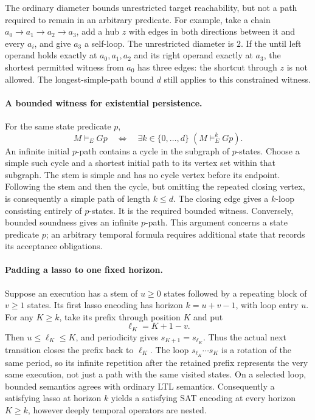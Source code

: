 The ordinary diameter bounds unrestricted target reachability,
but not a path required to remain in an arbitrary predicate.
For example, take a chain \(a_0\to a_1\to a_2\to a_3\),
add a hub \(z\) with edges in both directions between it
and every \(a_i\), and give \(a_3\) a self-loop. The
unrestricted diameter is \(2\). If the until left operand
holds exactly at \(a_0,a_1,a_2\) and its right operand
exactly at \(a_3\), the shortest permitted witness from
\(a_0\) has three edges: the shortcut through \(z\) is
not allowed. The longest-simple-path bound \(d\) still
applies to this constrained witness.

\paragraph{A bounded witness for existential persistence.}
For the same state predicate \(p\),
\[
 M\models_E Gp
 \quad\Longleftrightarrow\quad
 \exists k\in\{0,\ldots,d\}\;(M\models_E^k Gp).
\]
An infinite initial \(p\)-path contains a cycle in the subgraph of
\(p\)-states. Choose a simple such cycle and a shortest initial path to
its vertex set within that subgraph. The stem is simple and has no cycle
vertex before its endpoint. Following the stem and then the cycle, but
omitting the repeated closing vertex, is consequently a simple path of
length \(k\leq d\). The closing edge gives a \(k\)-loop consisting entirely
of \(p\)-states. It is the required bounded witness. Conversely, bounded
soundness gives an infinite \(p\)-path. This argument concerns a state
predicate \(p\); an arbitrary temporal formula requires additional state
that records its acceptance obligations.

\paragraph{Padding a lasso to one fixed horizon.}
Suppose an execution has a stem of \(u\geq0\) states followed by
a repeating block of \(v\geq1\) states. Its first lasso encoding
has horizon \(k=u+v-1\), with loop entry \(u\).
For any \(K\geq k\), take its prefix through position \(K\) and put
\[
 \ell_K=K+1-v.
\]
Then \(u\leq\ell_K\leq K\), and periodicity gives
\(s_{K+1}=s_{\ell_K}\). Thus the actual next transition closes
the prefix back to \(\ell_K\). The loop
\(s_{\ell_K}\cdots s_K\) is a rotation of the same period,
so its infinite repetition after the retained prefix represents
the very same execution, not just a path with the same visited
states. On a selected loop, bounded semantics agrees with
ordinary LTL semantics. Consequently a satisfying lasso at
horizon \(k\) yields a satisfying SAT encoding at every
horizon \(K\geq k\), however deeply temporal operators are nested.

